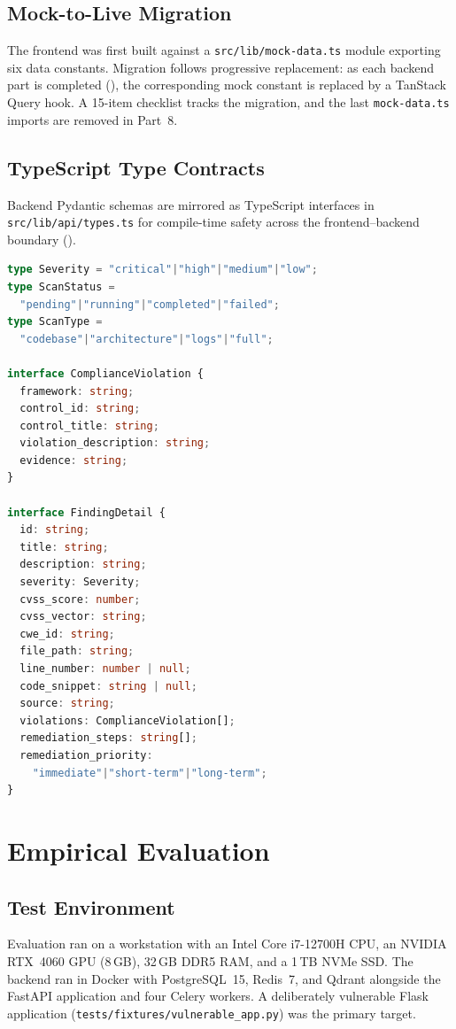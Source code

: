 \documentclass[conference]{IEEEtran}
\begin{document}
\subsection{Mock-to-Live Migration}
The frontend was first built against a \texttt{src/lib/mock-data.ts} module
exporting six data constants. Migration follows progressive replacement: as each
backend part is completed (), the corresponding mock
constant is replaced by a TanStack Query hook. A 15-item checklist tracks the
migration, and the last \texttt{mock-data.ts} imports are removed in Part~8.

\subsection{TypeScript Type Contracts}
Backend Pydantic schemas are mirrored as TypeScript interfaces in
\texttt{src/lib/api/types.ts} for compile-time safety across the
frontend--backend boundary ().

\begin{lstlisting}[language=TypeScript, label={lst:ts},
  caption={Canonical TypeScript type definitions (excerpt).}]
type Severity = "critical"|"high"|"medium"|"low";
type ScanStatus =
  "pending"|"running"|"completed"|"failed";
type ScanType =
  "codebase"|"architecture"|"logs"|"full";

interface ComplianceViolation {
  framework: string;
  control_id: string;
  control_title: string;
  violation_description: string;
  evidence: string;
}

interface FindingDetail {
  id: string;
  title: string;
  description: string;
  severity: Severity;
  cvss_score: number;
  cvss_vector: string;
  cwe_id: string;
  file_path: string;
  line_number: number | null;
  code_snippet: string | null;
  source: string;
  violations: ComplianceViolation[];
  remediation_steps: string[];
  remediation_priority:
    "immediate"|"short-term"|"long-term";
}
\end{lstlisting}

\section{Empirical Evaluation}
\label{sec:eval}

\subsection{Test Environment}
Evaluation ran on a workstation with an Intel Core i7-12700H CPU, an NVIDIA
RTX~4060 GPU (8\,GB), 32\,GB DDR5 RAM, and a 1\,TB NVMe SSD. The backend ran in
Docker with PostgreSQL~15, Redis~7, and Qdrant alongside the FastAPI application
and four Celery workers. A deliberately vulnerable Flask application
(\texttt{tests/fixtures/vulnerable\_app.py}) was the primary target.
\end{document}
